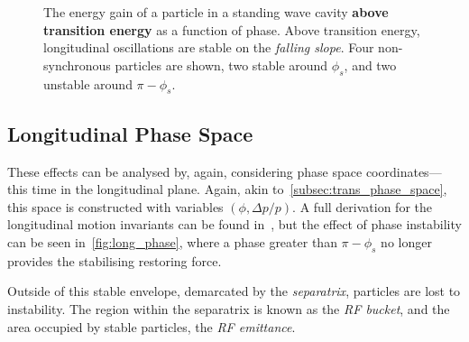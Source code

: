 \documentclass[11pt]{report}
\begin{document}
\begin{figure}[h]
  \caption{The energy gain of a particle in a standing wave cavity \textbf{above transition energy} as a function of phase. Above transition energy, longitudinal oscillations are stable on the \textit{falling slope}. Four non-synchronous particles are shown, two stable around $\phi_s$, and two unstable around $\pi-\phi_s$.}\label{fig:long_phase}
\end{figure}

\subsection{Longitudinal Phase Space}

These effects can be analysed by, again, considering phase space coordinates---this time in the longitudinal plane. Again, akin to~\autoref{subsec:trans_phase_space}, this space is constructed with variables $(\phi , \Delta p/p)$. A full derivation for the longitudinal motion invariants can be found in~\cite{lbd:tecker}, but the effect of phase instability can be seen in~\autoref{fig:long_phase}, where a phase greater than $\pi-\phi_s$ no longer provides the stabilising restoring force. 

Outside of this stable envelope, demarcated by the \textit{separatrix}, particles are lost to instability. The region within the separatrix is known as the \textit{RF bucket}, and the area occupied by stable particles, the \textit{RF emittance}.
\end{document}
